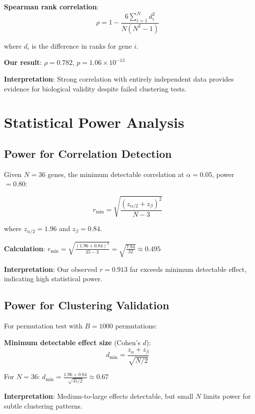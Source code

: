 \documentclass[12pt,letterpaper]{article}
\theoremstyle{definition}
\theoremstyle{remark}
\begin{document}
\textbf{Spearman rank correlation}:
\begin{equation}
\rho = 1 - \frac{6\sum_{i=1}^N d_i^2}{N(N^2-1)}
\end{equation}

where $d_i$ is the difference in ranks for gene $i$.

\textbf{Our result}: $\rho = 0.782$, $p = 1.06 \times 10^{-13}$

\textbf{Interpretation}: Strong correlation with entirely independent data provides evidence for biological validity despite failed clustering tests.

\section{Statistical Power Analysis}

\subsection{Power for Correlation Detection}

Given $N=36$ genes, the minimum detectable correlation at $\alpha=0.05$, power $=0.80$:

\begin{equation}
r_{\text{min}} = \sqrt{\frac{(z_{\alpha/2} + z_{\beta})^2}{N - 3}}
\end{equation}

where $z_{\alpha/2} = 1.96$ and $z_{\beta} = 0.84$.

\textbf{Calculation}: $r_{\text{min}} = \sqrt{\frac{(1.96 + 0.84)^2}{35 - 3}} = \sqrt{\frac{7.84}{32}} \approx 0.495$

\textbf{Interpretation}: Our observed $r=0.913$ far exceeds minimum detectable effect, indicating high statistical power.

\subsection{Power for Clustering Validation}

For permutation test with $B=1000$ permutations:

\textbf{Minimum detectable effect size} (Cohen's $d$):
\begin{equation}
d_{\text{min}} = \frac{z_{\alpha} + z_{\beta}}{\sqrt{N/2}}
\end{equation}

For $N=36$: $d_{\text{min}} = \frac{1.96 + 0.84}{\sqrt{35/2}} \approx 0.67$

\textbf{Interpretation}: Medium-to-large effects detectable, but small $N$ limits power for subtle clustering patterns.
\end{document}
